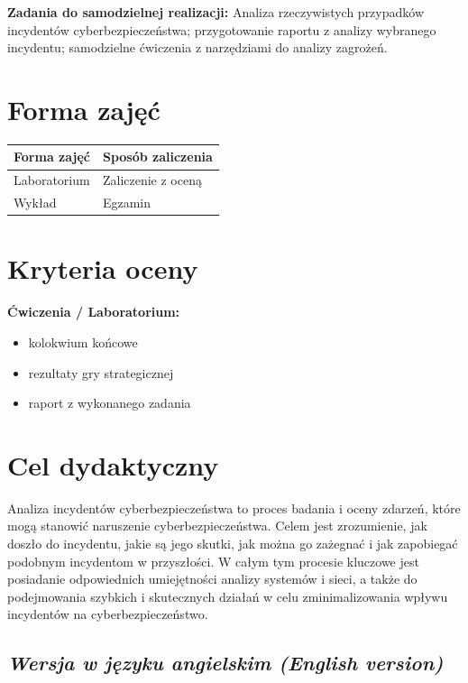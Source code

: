 \documentclass[12pt, a4paper]{article}
\newcommand{\thdrule}{\noalign{\global\setlength{\extrarowheight}{0pt}}}
\newcommand{\thdend}{\noalign{\global\setlength{\extrarowheight}{3pt}}}
\begin{document}
\vspace{4pt}
\noindent\textbf{Zadania do samodzielnej realizacji:} Analiza rzeczywistych przypadków incydentów cyberbezpieczeństwa; przygotowanie raportu z analizy wybranego incydentu; samodzielne ćwiczenia z narzędziami do analizy zagrożeń.

\section{Forma zajęć}

\begin{center}
{\scriptsize
\begin{tabular}{m{5cm}m{8cm}}
\thdrule\toprule
\rowcolor{pjatkRed} {\color{white}\textbf{Forma zajęć}} & {\color{white}\textbf{Sposób zaliczenia}} \\
\midrule\thdend
  \rowcolor{tableRowLight} Laboratorium & Zaliczenie z oceną \\
  \rowcolor{tableRowAlt} Wykład & Egzamin \\
\bottomrule
\end{tabular}}
\end{center}

\section{Kryteria oceny}

\textbf{Ćwiczenia / Laboratorium:}
\begin{itemize}
  \item kolokwium końcowe
  \item rezultaty gry strategicznej
  \item raport z wykonanego zadania
\end{itemize}


\section{Cel dydaktyczny}

Analiza incydentów cyberbezpieczeństwa to proces badania i oceny zdarzeń, które mogą stanowić naruszenie cyberbezpieczeństwa. Celem jest zrozumienie, jak doszło do incydentu, jakie są jego skutki, jak można go zażegnać i jak zapobiegać podobnym incydentom w przyszłości. W całym tym procesie kluczowe jest posiadanie odpowiednich umiejętności analizy systemów i sieci, a także do podejmowania szybkich i skutecznych działań w celu zminimalizowania wpływu incydentów na cyberbezpieczeństwo.

\subsection*{\textit{Wersja w języku angielskim (English version)}}
\end{document}
